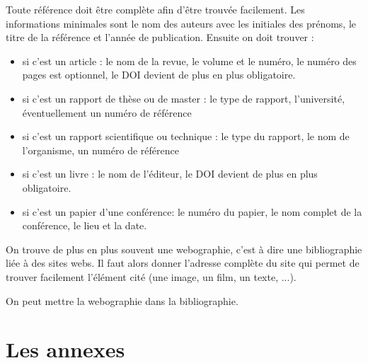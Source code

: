 Toute référence doit être complète afin d'être trouvée facilement. Les informations minimales sont le nom des auteurs avec les initiales des prénoms,
le titre de la référence et l'année de publication.
Ensuite on doit trouver :
\begin{itemize}
\item si c'est un article :  le nom de la revue, le volume et le numéro, le numéro des pages est optionnel, le DOI devient de plus en plus obligatoire.
\item si c'est un rapport de thèse ou de master : le type de rapport, l'université, éventuellement un numéro de référence
\item si c'est un rapport scientifique ou technique : le type du rapport, le nom de l'organisme, un numéro de référence
\item si c'est un livre : le nom de l'éditeur, le DOI devient de plus en plus obligatoire.
\item si c'est un papier d'une conférence: le numéro du papier, le nom complet de la conférence, le lieu et la date.  
\end{itemize}

On trouve de plus en plus souvent une webographie, c'est à dire une bibliographie liée à des sites webs. Il faut alors donner l'adresse complète du site qui permet de trouver facilement l'élément cité (une image, un film, un texte, ...).

On peut mettre la webographie dans la bibliographie.




\section{Les annexes}



